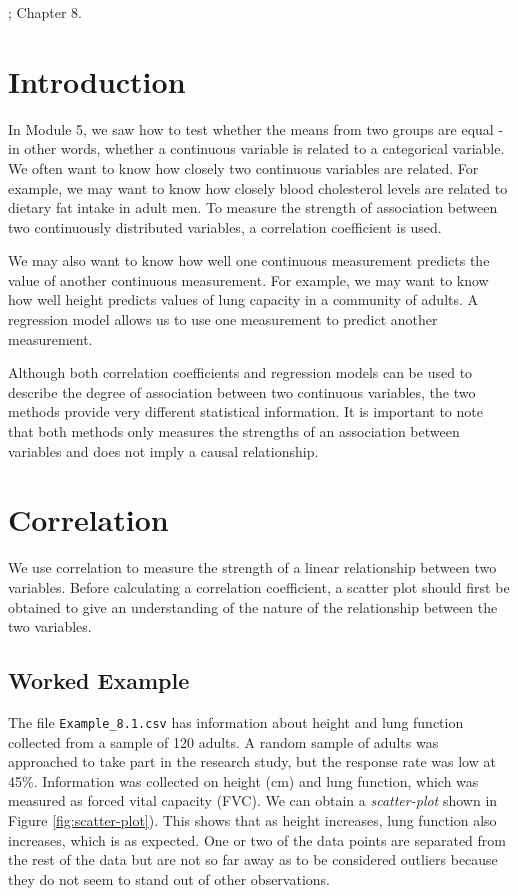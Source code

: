 \documentclass[
]{memoir}
\begin{document}
\citet{acock10}; Chapter 8.

\hypertarget{introduction}{%
\section{Introduction}\label{introduction}}

In Module 5, we saw how to test whether the means from two groups are equal - in other words, whether a continuous variable is related to a categorical variable. We often want to know how closely two continuous variables are related. For example, we may want to know how closely blood cholesterol levels are related to dietary fat intake in adult men. To measure the strength of association between two continuously distributed variables, a correlation coefficient is used.

We may also want to know how well one continuous measurement predicts the value of another continuous measurement. For example, we may want to know how well height predicts values of lung capacity in a community of adults. A regression model allows us to use one measurement to predict another measurement.

Although both correlation coefficients and regression models can be used to describe the degree of association between two continuous variables, the two methods provide very different statistical information. It is important to note that both methods only measures the strengths of an association between variables and does not imply a causal relationship.

\hypertarget{correlation}{%
\section{Correlation}\label{correlation}}

We use correlation to measure the strength of a linear relationship between two variables. Before calculating a correlation coefficient, a scatter plot should first be obtained to give an understanding of the nature of the relationship between the two variables.

\hypertarget{worked-example}{%
\subsection{Worked Example}\label{worked-example}}

The file \texttt{Example\_8.1.csv} has information about height and lung function collected from a sample of 120 adults. A random sample of adults was approached to take part in the research study, but the response rate was low at 45\%. Information was collected on height (cm) and lung function, which was measured as forced vital capacity (FVC). We can obtain a \emph{scatter-plot} shown in Figure \ref{fig:scatter-plot}). This shows that as height increases, lung function also increases, which is as expected. One or two of the data points are separated from the rest of the data but are not so far away as to be considered outliers because they do not seem to stand out of other observations.
\end{document}

